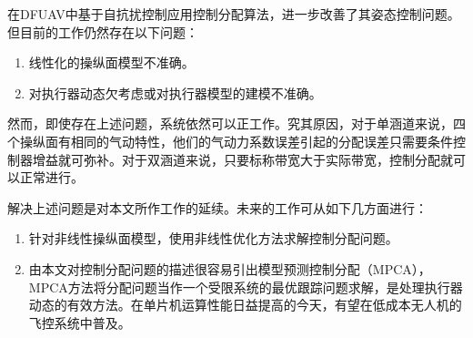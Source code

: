 在DFUAV中基于自抗扰控制应用控制分配算法，进一步改善了其姿态控制问题。但目前的工作仍然存在以下问题：
\begin{enumerate}
	\item 	线性化的操纵面模型不准确。
	\item	对执行器动态欠考虑或对执行器模型的建模不准确。
\end{enumerate}

然而，即使存在上述问题，系统依然可以正工作。究其原因，对于单涵道来说，四个操纵面有相同的气动特性，他们的气动力系数误差引起的分配误差只需要条件控制器增益就可弥补。对于双涵道来说，只要标称带宽大于实际带宽，控制分配就可以正常进行。

解决上述问题是对本文所作工作的延续。未来的工作可从如下几方面进行：

\begin{enumerate}
	\item 	针对非线性操纵面模型，使用非线性优化方法求解控制分配问题。
	\item	由本文对控制分配问题的描述很容易引出模型预测控制分配（MPCA），MPCA方法将分配问题当作一个受限系统的最优跟踪问题求解，是处理执行器动态的有效方法。在单片机运算性能日益提高的今天，有望在低成本无人机的飞控系统中普及。
\end{enumerate}